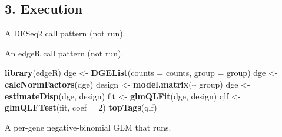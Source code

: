 \documentclass[
]{article}
\newenvironment{Shaded}{\begin{snugshade}}{\end{snugshade}}
\newcommand{\AttributeTok}[1]{\textcolor[rgb]{0.13,0.29,0.53}{#1}}
\newcommand{\DecValTok}[1]{\textcolor[rgb]{0.00,0.00,0.81}{#1}}
\newcommand{\FunctionTok}[1]{\textcolor[rgb]{0.13,0.29,0.53}{\textbf{#1}}}
\newcommand{\NormalTok}[1]{#1}
\newcommand{\OtherTok}[1]{\textcolor[rgb]{0.56,0.35,0.01}{#1}}
\newcommand{\SpecialCharTok}[1]{\textcolor[rgb]{0.81,0.36,0.00}{\textbf{#1}}}
\newcommand{\StringTok}[1]{\textcolor[rgb]{0.31,0.60,0.02}{#1}}
\begin{document}
\subsection{3. Execution}\label{execution}

A DESeq2 call pattern (not run).

\begin{Shaded}
\end{Shaded}

An edgeR call pattern (not run).

\begin{Shaded}
\begin{Highlighting}[]
\FunctionTok{library}\NormalTok{(edgeR)}
\NormalTok{dge }\OtherTok{\textless{}{-}} \FunctionTok{DGEList}\NormalTok{(}\AttributeTok{counts =}\NormalTok{ counts, }\AttributeTok{group =}\NormalTok{ group)}
\NormalTok{dge }\OtherTok{\textless{}{-}} \FunctionTok{calcNormFactors}\NormalTok{(dge)}
\NormalTok{design }\OtherTok{\textless{}{-}} \FunctionTok{model.matrix}\NormalTok{(}\SpecialCharTok{\textasciitilde{}}\NormalTok{ group)}
\NormalTok{dge }\OtherTok{\textless{}{-}} \FunctionTok{estimateDisp}\NormalTok{(dge, design)}
\NormalTok{fit }\OtherTok{\textless{}{-}} \FunctionTok{glmQLFit}\NormalTok{(dge, design)}
\NormalTok{qlf }\OtherTok{\textless{}{-}} \FunctionTok{glmQLFTest}\NormalTok{(fit, }\AttributeTok{coef =} \DecValTok{2}\NormalTok{)}
\FunctionTok{topTags}\NormalTok{(qlf)}
\end{Highlighting}
\end{Shaded}

A per-gene negative-binomial GLM that runs.
\end{document}
